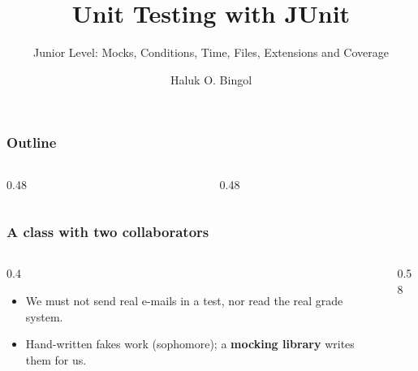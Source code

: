 \documentclass[aspectratio=169,10pt,compress]{beamer}
\title{Unit Testing with JUnit}
\subtitle{Junior Level: Mocks, Conditions, Time, Files, Extensions and Coverage}
\author[Bingol]{Haluk O. Bingol}
\institute[FCIS]{
    Faculty of Computer and Information Sciences\\
    Yeditepe University
}
\date{
	{\tiny \hbTimeStamp}
}
\begin{document}
\begin{frame}[t,fragile]
  \titlepage
\end{frame}




\begin{frame}[t,fragile] \frametitle{Outline}
  \begin{columns}[T]
    \begin{column}{0.48\textwidth}
      \tableofcontents[sections={1-4}, hideallsubsections]
    \end{column}
    \begin{column}{0.48\textwidth}
      \tableofcontents[sections={5-9}, hideallsubsections]
    \end{column}
  \end{columns}
\end{frame}





\begin{frame}[t,fragile] \frametitle{A class with two collaborators}
  \begin{columns}[T]
    \begin{column}{0.4\textwidth}
      \begin{itemize}\small
        \item We must not send real e-mails in a test, nor read the real grade system.
        \item Hand-written fakes work (sophomore); a \textbf{mocking library} writes them for us.
      \end{itemize}
    \end{column}
    \begin{column}{0.58\textwidth}
    \end{column}
  \end{columns}
\end{frame}
\end{document}
